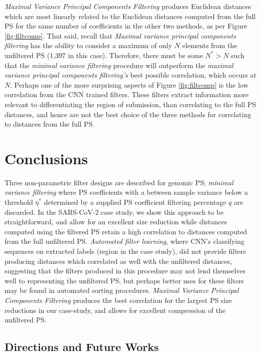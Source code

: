 \documentclass[10pt,conference]{IEEEtran}
\begin{document}
\textit{Maximal Variance Principal Components Filtering} produces Euclidean distances which are most linearly related to the Euclidean distances computed from the full PS for the same number of coefficients in the other two methods, as per Figure \ref{fig:filtcomp}.
That said, recall that \textit{Maximal variance principal components filtering} has the ability to consider a maximum of only $N$ elements from the unfiltered PS (1,397 in this case).  Therefore, there must be some $N^* > N$ such that the \textit{minimal variance filtering} procedure will outperform the \textit{maximal variance principal components filtering's} best possible correlation, which occurs at $N$. 
Perhaps one of the more surprising aspects of Figure \ref{fig:filtcomp} is the low correlation from the CNN trained filters.  
These filters extract information more relevant to differentiating the region of submission, than correlating to the full PS distances, and hence are not the best choice of the three methods for correlating to distances from the full PS.
 
\section{Conclusions}

Three non-parametric filter designs are described for genomic PS; \textit{minimal variance filtering} where PS coefficients with a between sample variance below a threshold $\eta^*$ determined by a supplied PS coefficient filtering percentage $q$ are discarded. In the SARS-CoV-2 case study, we show this approach to be straightforward, and allow for an excellent size reduction while distances computed using the filtered PS retain a high correlation to distances computed from the full unfiltered PS. \textit{Automated filter learning}, where CNN's classifying sequences on extracted labels (region in the case study), did not provide filters producing distances which correlated as well with the unfiltered distances, suggesting that the filters produced in this procedure may not lend themselves well to representing the unfiltered PS, but perhaps better uses for these filters may be found in automated sorting procedures. \textit{Maximal Variance Principal Components Filtering} produces the best correlation for the largest PS size reductions in our case-study, and allows for excellent compression of the unfiltered PS. 

\label{sec:conc}

\subsection{Directions and Future Works} 
\end{document}
